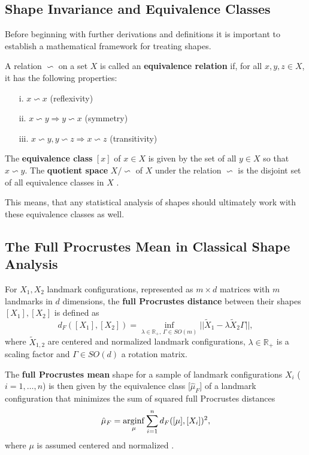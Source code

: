 \subsection{Shape Invariance and Equivalence Classes}
\label{intro:inv}
Before beginning with further derivations and definitions it is important to establish a mathematical framework for treating shapes.

\begin{definition} 
    A relation $\backsim$ on a set $X$ is called an \textbf{equivalence
    relation} if, for all $x,y,z \in X$, it has the following properties:
    \begin{itemize}[noitemsep,topsep=0pt]
        \item[i.] $x \backsim x$ (reflexivity)
        \item[ii.] $x \backsim y \Rightarrow y \backsim x$ (symmetry)
        \item[iii.] $x \backsim y, y \backsim z \Rightarrow x \backsim z$
        (transitivity)
    \end{itemize}
    The \textbf{equivalence class} $[x]$ of $x \in X$ is given by the set of
    all $y \in X$ so that $x \backsim y$.
    The \textbf{quotient space} $X \big/ {\backsim}$ of $X$ under the relation
    $\backsim$ is the disjoint set of all equivalence classes in $X$ 
    \parencite[see][40]{SrivastavaKlassen2016}.
\end{definition}
\noindent This means, that any statistical analysis of shapes should ultimately
work with these equivalence classes as well.


\subsection{The Full Procrustes Mean in Classical Shape Analysis}
\label{intro:proc}
\begin{definition}
    For $X_1, X_2$ landmark configurations, represented as $m \times d$
    matrices with $m$ landmarks in $d$ dimensions, the \textbf{full Procrustes
    distance} between their shapes $[X_1], [X_2]$ is defined as
    $$d_F([X_1], [X_2]) = 
      \inf_{\lambda \in \mathbb{R}_+,\, \Gamma \in SO(m)} ||\widetilde{X}_1 - \lambda
      \widetilde{X}_2\Gamma||, $$
    where $\widetilde{X}_{1,2}$ are centered and normalized landmark
    configurations, $\lambda \in \mathbb{R}_+$ is a scaling factor and $\Gamma
    \in SO(d)$ a rotation matrix.

    The \textbf{full Procrustes mean} shape for a sample of landmark
    configurations $X_i$ ($i = 1,\dots,n$) is then given by the equivalence
    class [$\hat\mu_F$] of a landmark configuration that minimizes the sum of
    squared full Procrustes distances
    $$\hat{\mu}_F = \operatorname*{arginf}_{\mu} \sum_{i=1}^n d_F([\mu], [X_i])^2, $$
    where $\mu$ is assumed centered and normalized
    \parencites[see][71,114]{DrydenMardia2016}.
\end{definition}



